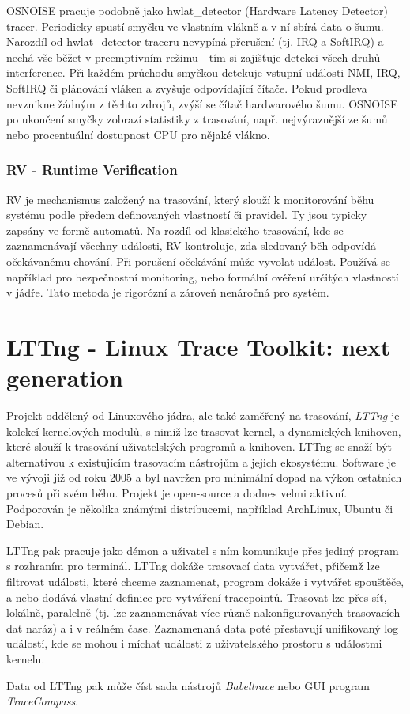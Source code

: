 OSNOISE pracuje podobně jako hwlat\_detector (Hardware Latency Detector) tracer. Periodicky spustí smyčku ve vlastním vlákně a v ní sbírá data o šumu. Narozdíl od hwlat\_detector traceru nevypíná přerušení (tj. IRQ a SoftIRQ) a nechá vše běžet v preemptivním režimu - tím si zajišťuje detekci všech druhů interference. Při každém průchodu smyčkou detekuje vstupní události NMI, IRQ, SoftIRQ či plánování vláken a zvyšuje odpovídající čítače. Pokud prodleva nevznikne žádným z těchto zdrojů, zvýší se čítač hardwarového šumu. OSNOISE po ukončení smyčky zobrazí statistiky z trasování, např. nejvýraznější ze šumů nebo procentuální dostupnost CPU pro nějaké vlákno.

\subsubsection*{RV - Runtime Verification}

RV je mechanismus založený na trasování, který slouží k monitorování běhu systému podle předem definovaných vlastností či pravidel. Ty jsou typicky zapsány ve formě automatů. Na rozdíl od klasického trasování, kde se zaznamenávají všechny události, RV kontroluje, zda sledovaný běh odpovídá očekávanému chování. Při porušení očekávání může vyvolat událost. Používá se například pro bezpečnostní monitoring, nebo formální ověření určitých vlastností v jádře. Tato metoda je rigorózní a zároveň nenáročná pro systém.

\section{LTTng - Linux Trace Toolkit: next generation}

Projekt oddělený od Linuxového jádra, ale také zaměřený na trasování, \emph{LTTng} \cite{LTTng-Pages} je kolekcí kernelových modulů, s nimiž lze trasovat kernel, a dynamických knihoven, které slouží k trasování uživatelských programů a knihoven. LTTng se snaží být alternativou k existujícím trasovacím nástrojům a jejich ekosystému. Software je ve vývoji již od roku 2005 a byl navržen pro minimální dopad na výkon ostatních procesů při svém běhu. Projekt je open-source a dodnes velmi aktivní. Podporován je několika známými distribucemi, například ArchLinux, Ubuntu či Debian.

LTTng pak pracuje jako démon a uživatel s ním komunikuje přes jediný program s rozhraním pro terminál. LTTng dokáže trasovací data vytvářet, přičemž lze filtrovat události, které chceme zaznamenat, program dokáže i vytvářet spouštěče, a nebo dodává vlastní definice pro vytváření tracepointů. Trasovat lze přes síť, lokálně, paralelně (tj. lze zaznamenávat více různě nakonfigurovaných trasovacích dat naráz) a i v reálném čase. Zaznamenaná data poté přestavují unifikovaný log událostí, kde se mohou i míchat události z uživatelského prostoru s událostmi kernelu.

Data od LTTng pak může číst sada nástrojů \emph{Babeltrace} nebo GUI program \emph{TraceCompass}.